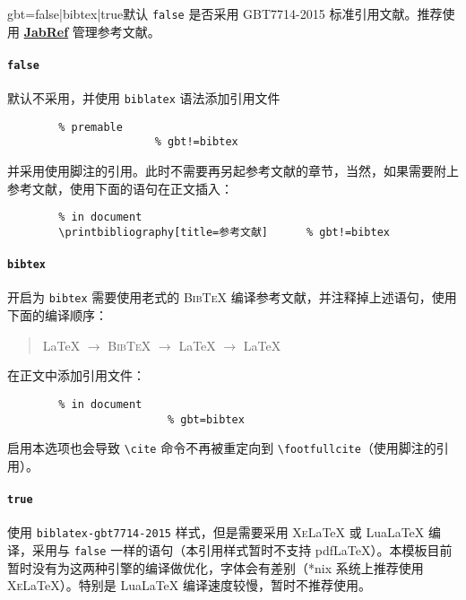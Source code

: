 \documentclass[a4paper,12pt]{article}
\begin{document}
\begin{docKey*}[SJTUBeamermin]{gbt}{=false|bibtex|true}{默认 \texttt{false}}
    是否采用 GBT7714-2015 标准引用文献。推荐使用 \href{https://www.jabref.org/}{\textbf{JabRef}} 管理参考文献。
    
    \paragraph{\texttt{false}} 默认不采用，并使用 \verb"biblatex" 语法添加引用文件
    \begin{verbatim}
        % premable
                       % gbt!=bibtex
    \end{verbatim}
    并采用使用脚注的引用。此时不需要再另起参考文献的章节，当然，如果需要附上参考文献，使用下面的语句在正文插入：
    \begin{verbatim}
        % in document
        \printbibliography[title=参考文献]      % gbt!=bibtex
    \end{verbatim}
    \paragraph{\texttt{bibtex}} 开启为 \verb"bibtex" 需要使用老式的 \textsc{Bib\TeX{}} 编译参考文献，并注释掉上述语句，使用下面的编译顺序：
    \begin{quotation}
        \LaTeX{} $\rightarrow$ \textsc{Bib\TeX{}} $\rightarrow$ \LaTeX{} $\rightarrow$ \LaTeX{}
    \end{quotation}
    在正文中添加引用文件：
    \begin{verbatim}
        % in document
                         % gbt=bibtex
    \end{verbatim}
    启用本选项也会导致 \verb"\cite" 命令不再被重定向到 \verb"\footfullcite"（使用脚注的引用）。
    \paragraph{\texttt{true}} 使用 \verb"biblatex-gbt7714-2015" 样式，但是需要采用 \textsc{Xe}\LaTeX{} 或 Lua\LaTeX{} 编译，采用与 \verb"false" 一样的语句（本引用样式暂时不支持 pdf\LaTeX{}）。本模板目前暂时没有为这两种引擎的编译做优化，字体会有差别（*nix 系统上推荐使用\textsc{Xe}\LaTeX{}）。特别是 Lua\LaTeX{} 编译速度较慢，暂时不推荐使用。 
\end{docKey*}
\end{document}
